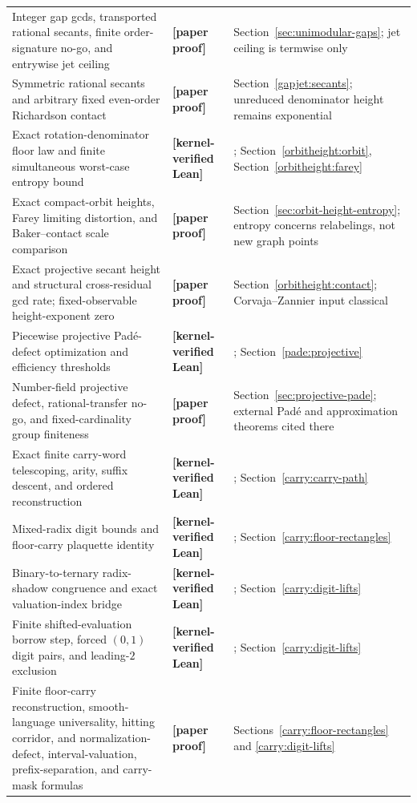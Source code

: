 \documentclass[11pt,oneside]{article}
\theoremstyle{definition}
\theoremstyle{remark}
\newcommand{\lean}[1]{\texttt{\detokenize{#1}}}
\newcommand{\statuslean}{\textcolor{leanblue}{\textbf{[kernel-verified Lean]}}}
\newcommand{\statusnew}{\textcolor{newgreen}{\textbf{[paper proof]}}}
\begin{document}
{\begin{longtable}{>{\raggedright\arraybackslash}p{}
                  >{\raggedright\arraybackslash}p{}
                  >{\raggedright\arraybackslash}p{}}
Integer gap gcds, transported rational secants, finite order-signature no-go, and entrywise
jet ceiling & \statusnew & Section~\ref{sec:unimodular-gaps}; jet ceiling is termwise only \\
Symmetric rational secants and arbitrary fixed even-order Richardson contact & \statusnew &
Section~\ref{gapjet:secants}; unreduced denominator height remains exponential \\
Exact rotation-denominator floor law and finite simultaneous worst-case entropy bound &
\statuslean & \lean{OrbitHeightEntropy}; Section~\ref{orbitheight:orbit},
Section~\ref{orbitheight:farey} \\
Exact compact-orbit heights, Farey limiting distortion, and Baker--contact scale comparison &
\statusnew & Section~\ref{sec:orbit-height-entropy}; entropy concerns relabelings, not new graph points \\
Exact projective secant height and structural cross-residual gcd rate; fixed-observable
height-exponent zero & \statusnew & Section~\ref{orbitheight:contact};
Corvaja--Zannier input classical \\
Piecewise projective Pad\'e-defect optimization and efficiency thresholds & \statuslean &
\lean{ProjectiveDefect}; Section~\ref{pade:projective} \\
Number-field projective defect, rational-transfer no-go, and fixed-cardinality group
finiteness & \statusnew & Section~\ref{sec:projective-pade}; external Pad\'e and approximation
theorems cited there \\
Exact finite carry-word telescoping, arity, suffix descent, and ordered reconstruction &
\statuslean & \lean{CarryPath}; Section~\ref{carry:carry-path} \\
Mixed-radix digit bounds and floor-carry plaquette identity & \statuslean &
\lean{MixedRadixCarryFinite}; Section~\ref{carry:floor-rectangles} \\
Binary-to-ternary radix-shadow congruence and exact valuation-index bridge & \statuslean &
\lean{RadixShadow}; Section~\ref{carry:digit-lifts} \\
Finite shifted-evaluation borrow step, forced $(0,1)$ digit pairs, and leading-$2$ exclusion & \statuslean &
\lean{BorrowBlockCore}; Section~\ref{carry:digit-lifts} \\
Finite floor-carry reconstruction, smooth-language universality, hitting corridor, and
normalization-defect, interval-valuation, prefix-separation, and carry-mask formulas &
\statusnew & Sections~\ref{carry:floor-rectangles} and \ref{carry:digit-lifts} \\

\end{longtable}}
\end{document}
